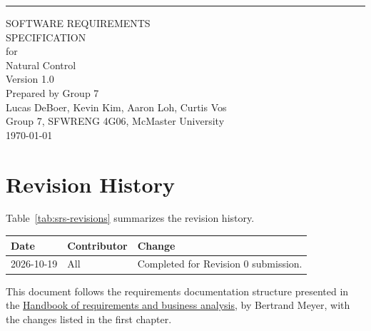 \documentclass{scrreprt}
\date{}
\def\myversion{1.0 }
\theoremstyle{definition}
\begin{document}
\begin{titlepage}
\begin{flushright}
    \rule{\linewidth}{2pt}\vskip1cm
    \begin{bfseries}
        \Huge{SOFTWARE REQUIREMENTS\\ SPECIFICATION}\\
        \vspace{1.1cm}
        for\\
        \vspace{1.1cm}
        Natural Control\\
        \vspace{1.1cm}
        \LARGE{Version \myversion}\\
        \vspace{1.1cm}
        Prepared by Group 7\\
        \Large{Lucas DeBoer, Kevin Kim, Aaron Loh, Curtis Vos}\\
        \vspace{1.1cm}
        Group 7, SFWRENG 4G06, McMaster University\\
        \vspace{1.1cm}
        \today\\
    \end{bfseries}
\end{flushright}
\end{titlepage}

\chapter*{Revision History}

Table~\ref{tab:srs-revisions} summarizes the revision history.
\begin{center}
\begin{minipage}{\textwidth}
\label{tab:srs-revisions}
\begin{tabularx}{\textwidth}{llX}
\toprule Date & Contributor & Change\\
\midrule
2026-10-19 & All & Completed for Revision 0 submission.\\
\bottomrule
\end{tabularx}
\end{minipage}
\end{center}

This document follows the requirements documentation structure presented in the \href{ https://link.springer.com/content/pdf/10.1007/978-3-031-06739-6.pdf}{Handbook of requirements and business analysis}, by Bertrand Meyer, with the changes listed in the first chapter.
\end{document}
